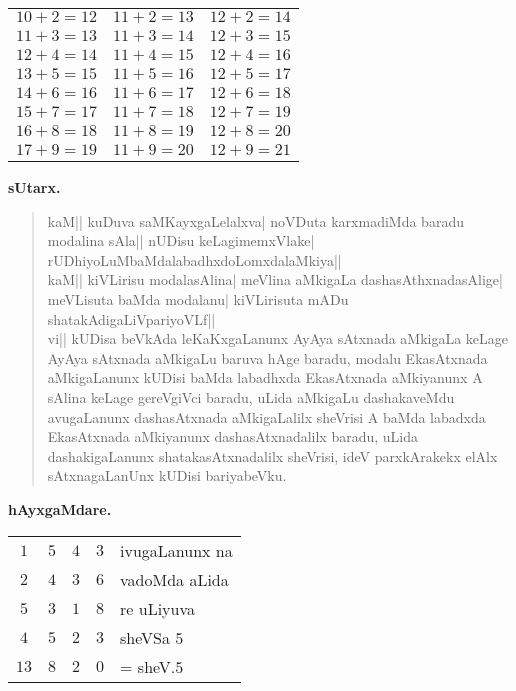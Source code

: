 {\begin{center}
\begin{tabular}{|l|l|l|}
$10 + 2 = 12 $ & $ 11 + 2 = 13 $ & $ 12 + 2 = 14 $\\
$11 + 3 = 13 $ & $ 11 + 3 = 14 $ & $ 12 + 3 = 15 $\\
$12 + 4 = 14 $ & $ 11 + 4 = 15 $ & $ 12 + 4 = 16 $\\
$13 + 5 = 15 $ & $ 11 + 5 = 16 $ & $ 12 + 5 = 17 $\\
$14 + 6 = 16 $ & $ 11 + 6 = 17 $ & $ 12 + 6 = 18 $\\
$15 + 7 = 17 $ & $ 11 + 7 = 18 $ & $ 12 + 7 = 19 $\\
$16 + 8 = 18 $ & $ 11 + 8 = 19 $ & $ 12 + 8 = 20 $\\
$17 + 9 = 19 $ & $ 11 + 9 = 20 $ & $ 12 + 9 = 21 $\\
\hline
\end{tabular}
\end{center}
}

\begin{center}
{\large\bf sUtarx.}
\end{center}

\begin{verse}
kaM|| kuDuva saMKayxgaLelalxva| noVDuta karxmadiMda baradu modalina sAla|| nUDisu keLagimemxVlake| rUDhiyoLuMbaMdalabadhxdoLomxdalaMkiya||\\

kaM|| kiVLirisu modalasAlina| meVlina aMkigaLa dashasAthxnadasAlige| meVLisuta baMda modalanu| kiVLirisuta mADu shatakAdigaLiVpariyoVLf||\\

vi|| kUDisa beVkAda leKaKxgaLanunx AyAya sAtxnada aMkigaLa keLage AyAya sAtxnada aMkigaLu baruva hAge baradu, modalu EkasAtxnada aMkigaLanunx kUDisi baMda labadhxda EkasAtxnada aMki\-yanunx A sAlina keLage gereVgiVci baradu, uLida aMkigaLu dashakaveMdu avugaLanunx dashasAtxnada aMkigaLalilx sheVrisi A baMda labadxda EkasAtxnada aMkiyanunx dashasAtxnadalilx baradu, uLida dashakigaLanunx shatakasAtxnadalilx sheVrisi, ideV parxkArakekx elAlx sAtxnagaLanUnx kUDisi bariyabeVku.\\
\end{verse}

\begin{center}
{\large\bf hAyxgaMdare.}
\medskip

\begin{tabular}{ccccl}
$1$ & $5$ & $4$ & $3$ & ivugaLanunx na \\
$2$ & $4$ & $3$ & $6$ & vadoMda aLida\\
$5$ & $3$ & $1$ & $8$ & re uLiyuva\\
$4$ & $5$ & $2$ & $3$ & sheVSa $5$\\
\hline
$13$ & $8$ & $2$ & $0$ & = sheV.$5$\\ 
\hline
\end{tabular}
\end{center}

